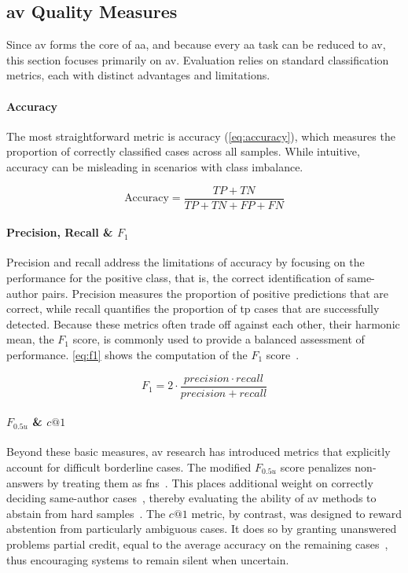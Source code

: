 \subsection{\ac{av} Quality Measures}
\label{subsec:av_quality_measures}

Since \ac{av} forms the core of \ac{aa}, and because every \ac{aa} task can be reduced to \ac{av}, this section focuses primarily on \ac{av}. 
Evaluation relies on standard classification metrics, each with distinct advantages and limitations.

\paragraph{Accuracy}
The most straightforward metric is accuracy (\autoref{eq:accuracy}), which measures the proportion of correctly classified cases across all samples. 
While intuitive, accuracy can be misleading in scenarios with class imbalance. 

\begin{equation}\label{eq:accuracy}
    \text{Accuracy} = \frac{TP + TN}{TP + TN + FP + FN}
\end{equation}

\paragraph{Precision, Recall \& $F_1$}
Precision and recall address the limitations of accuracy by focusing on the performance for the positive class, that is, the correct identification of same-author pairs. 
Precision measures the proportion of positive predictions that are correct, while recall quantifies the proportion of \ac{tp} cases that are successfully detected. 
Because these metrics often trade off against each other, their harmonic mean, the $F_1$ score, is commonly used to provide a balanced assessment of performance. 
\autoref{eq:f1} shows the computation of the $F_1$ score~\citep{neal_surveying_2018}.

\begin{equation}\label{eq:f1}
     F_1 = 2 \cdot \frac{precision \cdot recall}{precision + recall}
\end{equation}

\paragraph{$F_{0.5u}$ \& $c@1$}
Beyond these basic measures, \ac{av} research has introduced metrics that explicitly account for difficult borderline cases. 
The modified $F_{0.5u}$ score penalizes non-answers by treating them as \acp{fn}~\citep{bevendorff_overview_2024}. 
This places additional weight on correctly deciding same-author cases~\citep{weerasinghe_feature_vector_difference_2021}, thereby evaluating the ability of \ac{av} methods to abstain from hard samples~\citep{tyo_state_2022}. 
The $c@1$ metric, by contrast, was designed to reward abstention from particularly ambiguous cases. 
It does so by granting unanswered problems partial credit, equal to the average accuracy on the remaining cases~\citep{bevendorff_overview_2024}, thus encouraging systems to remain silent when uncertain.

